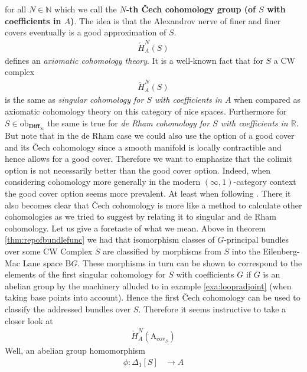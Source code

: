 for all $N \in \mathbb{N}$ which we call the \textbf{$N$-th \v{C}ech cohomology group (of $S$ with coefficients in $A$)}. The idea is that the Alexandrov nerve of finer and finer covers eventually is a good approximation of $S$.
\begin{align*}
  \check{H}_{A}^{N}
  \left(
    S
  \right)
\end{align*}
defines an \textit{axiomatic cohomology theory}. It is a well-known fact that for $S$ a CW complex
\begin{align*}
  \check{H}_{A}^{N}
  \left(
    S
  \right)
\end{align*}
is the same as \textit{singular cohomology for $S$ with coefficients in $A$} when compared as axiomatic cohomology theory on this category of nice spaces. Furthermore for $S \in \mathrm{ob}_{\mathbf{Diff}_{\infty}}$ the same is true for \textit{de Rham cohomology for $S$ with coefficients in $\mathbb{R}$}. But note that in the de Rham case we could also use the option of a good cover and its \v{C}ech cohomology since a smooth manifold is locally contractible and hence allows for a good cover. Therefore we want to emphasize that the colimit option is not necessarily better than the good cover option. Indeed, when considering cohomology more generally in the modern $(\infty,1)$-category context the good cover option seems more prevalent. At least when following \cite{a565d200}. There it also becomes clear that \v{C}ech cohomology is more like a method to calculate other cohomologies as we tried to suggest by relating it to singular and de Rham cohomology. Let us give a foretaste of what we mean. Above in theorem \ref{thm:repofbundlefunc} we had that isomorphism classes of $G$-principal bundles over some CW Complex $S$ are classified by morphisms from $S$ into the Eilenberg-Mac Lane space $\mathrm{B}G$. These morphisms in turn can be shown to correspond to the elements of the first singular cohomology for $S$ with coefficients $G$ if $G$ is an abelian group by the machinery alluded to in example \ref{exa:loopradjoint} (when taking base points into account). Hence the first \v{C}ech cohomology can be used to classify the addressed bundles over $S$. Therefore it seems instructive to take a closer look at
\begin{align*}
  \check{H}_{A}^{N}
  \left(
    \mathrm{A}_{\mathrm{cov}_{S}}
  \right)
\end{align*}
Well, an abelian group homomorphism
\begin{align*}
  \phi
  \colon
  \Delta_{1}[S]
  &\rightarrow
  A
\end{align*}
